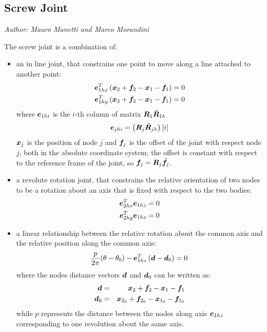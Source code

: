 \subsection{Screw Joint}
\emph{Author: Mauro Manetti and Marco Morandini}

The screw joint is a combination of:
\begin{itemize}
\item an in line joint, that constrains one point to move along 
a line attached to another point:
\begin{align*}
	\bm{e}_{1hx}^T\left( \bm{x}_2 + \bm{f}_2 - \bm{x}_1 - \bm{f}_1 \right) &= 0 \\
	\bm{e}_{1hy}^T\left( \bm{x}_2 + \bm{f}_2 - \bm{x}_1 - \bm{f}_1 \right) &= 0
\end{align*}
where $\bm{e}_{1hi}$ is the $i$-th column of matrix
$\bm{R}_1 \tilde{\bm{R}}_{1h}$
\begin{equation}
	\bm{e}_{jhi} = \left( \bm{R}_j \tilde{\bm{R}}_{jh} \right)\left[ i \right]
\end{equation}
$\bm{x}_j$ is the position of node $j$
and $\bm{f}_j$ is the offset of the joint with respect node $j$,
both in the absolute coordinate system; the offset is constant
with respect to the reference frame of the joint,
so $\bm{f}_j=\bm{R}_j\tilde{\bm{f}}_j$.

\item a revolute rotation joint, that constrains the relative
orientation of two nodes to be a rotation about an axis that
is fixed with respect to the two bodies:
\begin{align*}
	\bm{e}_{2hx}^T \bm{e}_{1hz} = 0 \\
	\bm{e}_{2hy}^T \bm{e}_{1hz} = 0
\end{align*}

\item a linear relationship between the relative rotation
about the common axis and the relative position along the common axis:
\begin{equation}
	\label{eq:SCREW-constraint}
	\frac{p}{2 \pi} (\theta - \theta_0 ) - \bm{e}_{1hz}^T\left( \bm{d} - \bm{d}_0 \right) = 0
\end{equation}
where the nodes distance vectors $\bm{d}$ and $\bm{d}_0$ can be written
as:
\begin{eqnarray}
        \nonumber 
        \bm{d} &=& \bm{x}_2 + \bm{f}_2 - \bm{x}_1 - \bm{f}_1 \\
        \nonumber
        \bm{d}_0 &=& \bm{x}_{2_0} + \bm{f}_{2_0} - \bm{x}_{1_0} - \bm{f}_{1_0}
\end{eqnarray}  
while $p$ represents the distance between the nodes 
along axis $\bm{e}_{1hz}$ corresponding to one revolution 
about the same axis.
\end{itemize}

